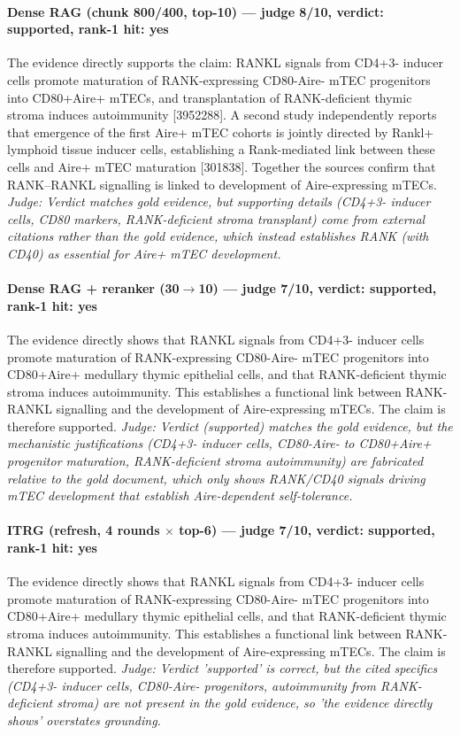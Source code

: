 \documentclass[sigconf, review, anonymous]{acmart}
\begin{document}
\paragraph{Dense RAG (chunk 800/400, top-10) --- judge 8/10, verdict: supported, rank-1 hit: yes}
\noindent The evidence directly supports the claim: RANKL signals from CD4+3- inducer cells promote maturation of RANK-expressing CD80-Aire- mTEC progenitors into CD80+Aire+ mTECs, and transplantation of RANK-deficient thymic stroma induces autoimmunity [3952288]. A second study independently reports that emergence of the first Aire+ mTEC cohorts is jointly directed by Rankl+ lymphoid tissue inducer cells, establishing a Rank-mediated link between these cells and Aire+ mTEC maturation [301838]. Together the sources confirm that RANK--RANKL signalling is linked to development of Aire-expressing mTECs.
\noindent\small\textit{Judge: Verdict matches gold evidence, but supporting details (CD4+3- inducer cells, CD80 markers, RANK-deficient stroma transplant) come from external citations rather than the gold evidence, which instead establishes RANK (with CD40) as essential for Aire+ mTEC development.}
\paragraph{Dense RAG + reranker (30$\to$10) --- judge 7/10, verdict: supported, rank-1 hit: yes}
\noindent The evidence directly shows that RANKL signals from CD4+3- inducer cells promote maturation of RANK-expressing CD80-Aire- mTEC progenitors into CD80+Aire+ medullary thymic epithelial cells, and that RANK-deficient thymic stroma induces autoimmunity. This establishes a functional link between RANK-RANKL signalling and the development of Aire-expressing mTECs. The claim is therefore supported.
\noindent\small\textit{Judge: Verdict (supported) matches the gold evidence, but the mechanistic justifications (CD4+3- inducer cells, CD80-Aire- to CD80+Aire+ progenitor maturation, RANK-deficient stroma autoimmunity) are fabricated relative to the gold document, which only shows RANK/CD40 signals driving mTEC development that establish Aire-dependent self-tolerance.}
\paragraph{ITRG (refresh, 4 rounds $\times$ top-6) --- judge 7/10, verdict: supported, rank-1 hit: yes}
\noindent The evidence directly shows that RANKL signals from CD4+3- inducer cells promote maturation of RANK-expressing CD80-Aire- mTEC progenitors into CD80+Aire+ medullary thymic epithelial cells, and that RANK-deficient thymic stroma induces autoimmunity. This establishes a functional link between RANK-RANKL signalling and the development of Aire-expressing mTECs. The claim is therefore supported.
\noindent\small\textit{Judge: Verdict 'supported' is correct, but the cited specifics (CD4+3- inducer cells, CD80-Aire- progenitors, autoimmunity from RANK-deficient stroma) are not present in the gold evidence, so 'the evidence directly shows' overstates grounding.}
\end{document}
